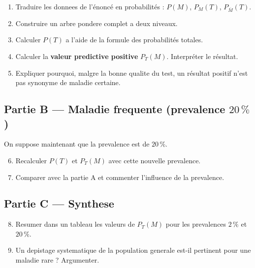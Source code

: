\begin{enumerate}
  \item Traduire les donnees de l'énoncé en probabilités : $P(M)$, $P_M(T)$, $P_{\overline{M}}(T)$.

  \item Construire un arbre pondere complet a deux niveaux.

  \item Calculer $P(T)$ a l'aide de la formule des probabilités totales.

  \item Calculer la \textbf{valeur predictive positive} $P_T(M)$. Interpréter le résultat.

  \item Expliquer pourquoi, malgre la bonne qualite du test, un résultat positif n'est pas synonyme de maladie certaine.
\end{enumerate}

\subsection*{Partie B --- Maladie frequente (prevalence $20\,\%$)}

On suppose maintenant que la prevalence est de $20\,\%$.

\begin{enumerate}
  \setcounter{enumi}{5}
  \item Recalculer $P(T)$ et $P_T(M)$ avec cette nouvelle prevalence.

  \item Comparer avec la partie A et commenter l'influence de la prevalence.
\end{enumerate}

\subsection*{Partie C --- Synthese}

\begin{enumerate}
  \setcounter{enumi}{7}
  \item Resumer dans un tableau les valeurs de $P_T(M)$ pour les prevalences $2\,\%$ et $20\,\%$.

  \item Un depistage systematique de la population generale est-il pertinent pour une maladie rare ? Argumenter.
\end{enumerate}
